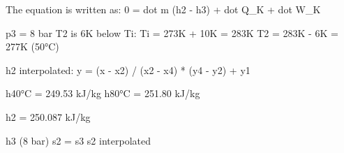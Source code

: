 The equation is written as:  
0 = dot m (h2 - h3) + dot Q_K + dot W_K  

p3 = 8 bar  
T2 is 6K below Ti:  
Ti = 273K + 10K = 283K  
T2 = 283K - 6K = 277K (50°C)  

h2 interpolated:  
y = (x - x2) / (x2 - x4) * (y4 - y2) + y1  

h40°C = 249.53 kJ/kg  
h80°C = 251.80 kJ/kg  

h2 = 250.087 kJ/kg  

h3 (8 bar)  
s2 = s3  
s2 interpolated